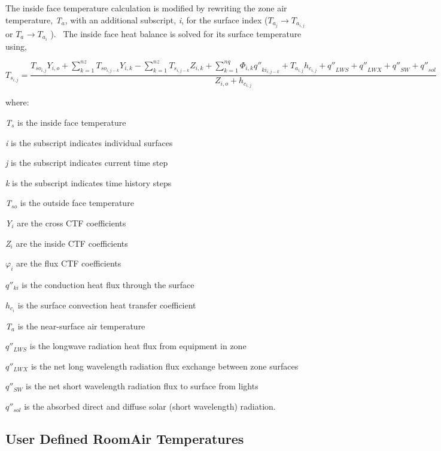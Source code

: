 The inside face temperature calculation is modified by rewriting the zone air temperature, \emph{T\(_{a}\)}, with an additional subscript, \emph{i}, for the surface index (\({T_{{a_j}}} \to {T_{{a_{i,j}}}}\) or \({T_{{a_{}}}} \to {T_{{a_i}}}\) ).~ The inside face heat balance is solved for its surface temperature using,

{\scriptsize
\begin{equation}
{T_{{s_{i,j}}}} = \frac{{{T_{s{o_{i,j}}}}{Y_{i,o}} + \sum\limits_{k = 1}^{nz} {{T_{s{o_{i,j - k}}}}} {Y_{i,k}} - \sum\limits_{k = 1}^{nz} {{T_{{s_{i,j - k}}}}} {Z_{i,k}} + \sum\limits_{k = 1}^{nq} {{\Phi_{i,k}}{{q''}_{k{i_{i,j - k}}}} + {T_{{a_{i,j}}}}{h_{{c_{i,j}}}} + {{q''}_{LWS}} + {{q''}_{LWX}} + {{q''}_{SW}} + {{q''}_{sol}}} }}{{{Z_{i,o}} + {h_{{c_{i,j}}}}}}
\end{equation}}

where:

\emph{T\(_{s}\)} is the inside face temperature

\emph{i} is the subscript indicates individual surfaces

\emph{j} is the subscript indicates current time step

\emph{k} is the subscript indicates time history steps

\emph{T\(_{so}\)} is the outside face temperature

\emph{Y\(_{i}\)} are the cross CTF coefficients

\emph{Z\(_{i}\)} are the inside CTF coefficients

\(\varphi_{i}\) are the flux CTF coefficients

\({q''_{ki}}\) is the conduction heat flux through the surface

\({h_{{c_i}}}\) is the surface convection heat transfer coefficient

\emph{T\(_{a}\)} is the near-surface air temperature

\({q''_{LWS}}\) is the longwave radiation heat flux from equipment in zone

\({q''_{LWX}}\) is the net long wavelength radiation flux exchange between zone surfaces

\({q''_{SW}}\) is the net short wavelength radiation flux to surface from lights

\({q''_{sol}}\) is the absorbed direct and diffuse solar (short wavelength) radiation.

\subsection{User Defined RoomAir Temperatures}\label{user-defined-roomair-temperatures}

